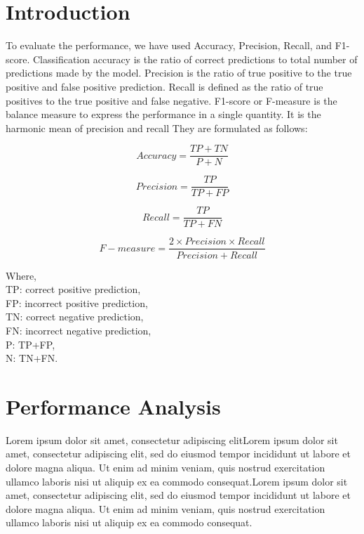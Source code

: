\section{Introduction}
To evaluate the performance, we have used Accuracy, Precision, Recall, and F1-score. Classification accuracy is the ratio of correct predictions to total number of predictions made by the model. Precision is the ratio of true positive to the true positive and false positive prediction. Recall is defined as the ratio of true positives to the true positive and false negative. F1-score or F-measure is the balance measure to express the performance in a single quantity. It is the harmonic mean of precision and recall
They are formulated as follows:

\begin{equation}
Accuracy=\frac{TP+TN}{P+N}
\end{equation} 

\begin{equation}
Precision=\frac{TP}{TP+FP}
\end{equation} 

\begin{equation}
Recall=\frac{TP}{TP+FN}
\end{equation} 

\begin{equation}
F-measure=\frac{2\times Precision \times Recall}{Precision+Recall}
\end{equation} 


Where,\\TP: correct positive prediction, \\FP: incorrect positive prediction, \\TN: correct negative prediction, \\FN: incorrect negative prediction, \\P: TP+FP, \\N: TN+FN.\\


\section{Performance Analysis}

Lorem ipsum dolor sit amet, consectetur adipiscing elitLorem ipsum dolor sit amet, consectetur adipiscing elit, sed do eiusmod tempor incididunt ut labore et dolore magna aliqua. Ut enim ad minim veniam, quis nostrud exercitation ullamco laboris nisi ut aliquip ex ea commodo consequat.Lorem ipsum dolor sit amet, consectetur adipiscing elit, sed do eiusmod tempor incididunt ut labore et dolore magna aliqua. Ut enim ad minim veniam, quis nostrud exercitation ullamco laboris nisi ut aliquip ex ea commodo consequat.
